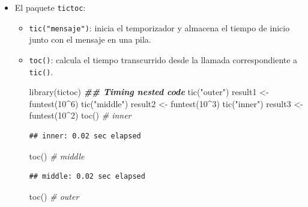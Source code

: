 \documentclass[
]{book}
\newenvironment{Shaded}{\begin{snugshade}}{\end{snugshade}}
\newcommand{\CommentTok}[1]{\textcolor[rgb]{0.56,0.35,0.01}{\textit{#1}}}
\newcommand{\DecValTok}[1]{\textcolor[rgb]{0.00,0.00,0.81}{#1}}
\newcommand{\DocumentationTok}[1]{\textcolor[rgb]{0.56,0.35,0.01}{\textbf{\textit{#1}}}}
\newcommand{\FunctionTok}[1]{\textcolor[rgb]{0.00,0.00,0.00}{#1}}
\newcommand{\NormalTok}[1]{#1}
\newcommand{\OtherTok}[1]{\textcolor[rgb]{0.56,0.35,0.01}{#1}}
\newcommand{\SpecialCharTok}[1]{\textcolor[rgb]{0.00,0.00,0.00}{#1}}
\newcommand{\StringTok}[1]{\textcolor[rgb]{0.31,0.60,0.02}{#1}}
\theoremstyle{break}
\theoremstyle{nonumberplain}
\begin{document}
\begin{itemize}
\item
  El paquete \texttt{tictoc}:

  \begin{itemize}
  \item
    \texttt{tic("mensaje")}: inicia el temporizador y almacena el tiempo de inicio junto con el mensaje en una pila.
  \item
    \texttt{toc()}: calcula el tiempo transcurrido desde la llamada correspondiente a \texttt{tic()}.

\begin{Shaded}
\begin{Highlighting}[]
\FunctionTok{library}\NormalTok{(tictoc)}
\DocumentationTok{\#\# Timing nested code}
\FunctionTok{tic}\NormalTok{(}\StringTok{"outer"}\NormalTok{)}
\NormalTok{   result1 }\OtherTok{\textless{}{-}} \FunctionTok{funtest}\NormalTok{(}\DecValTok{10}\SpecialCharTok{\^{}}\DecValTok{6}\NormalTok{)}
   \FunctionTok{tic}\NormalTok{(}\StringTok{"middle"}\NormalTok{)}
\NormalTok{      result2 }\OtherTok{\textless{}{-}} \FunctionTok{funtest}\NormalTok{(}\DecValTok{10}\SpecialCharTok{\^{}}\DecValTok{3}\NormalTok{)}
      \FunctionTok{tic}\NormalTok{(}\StringTok{"inner"}\NormalTok{)}
\NormalTok{         result3 }\OtherTok{\textless{}{-}} \FunctionTok{funtest}\NormalTok{(}\DecValTok{10}\SpecialCharTok{\^{}}\DecValTok{2}\NormalTok{)}
      \FunctionTok{toc}\NormalTok{() }\CommentTok{\# inner}
\end{Highlighting}
\end{Shaded}

\begin{verbatim}
## inner: 0.02 sec elapsed
\end{verbatim}

\begin{Shaded}
\begin{Highlighting}[]
   \FunctionTok{toc}\NormalTok{() }\CommentTok{\# middle}
\end{Highlighting}
\end{Shaded}

\begin{verbatim}
## middle: 0.02 sec elapsed
\end{verbatim}

\begin{Shaded}
\begin{Highlighting}[]
\FunctionTok{toc}\NormalTok{() }\CommentTok{\# outer}
\end{Highlighting}
\end{Shaded}


\end{itemize}
\end{itemize}
\end{document}
